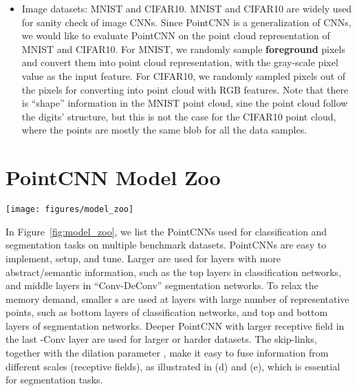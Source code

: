 \documentclass{article}
\begin{document}
\begin{itemize}[leftmargin=*]
	\item Image datasets: MNIST and CIFAR10. MNIST and CIFAR10 are widely used for sanity check of image CNNs. Since PointCNN is a generalization of CNNs, we would like to evaluate PointCNN on the point cloud representation of MNIST and CIFAR10. For MNIST, we randomly sample  \textbf{foreground} pixels and convert them into point cloud representation, with the gray-scale pixel value as the input feature. For CIFAR10, we randomly sampled  pixels out of the  pixels for converting into point cloud with RGB features. Note that there is ``shape'' information in the MNIST point cloud, sine the point cloud follow the digits' structure, but this is not the case for the CIFAR10 point cloud, where the points are mostly the same blob for all the data samples.
\end{itemize}

\section{PointCNN Model Zoo}
\label{sec:model_zoo}

\begin{figure*}[t!]
	\begin{center}
\texttt{[image: figures/model\_zoo]}
	\end{center}
	\caption{PointCNN model zoo, where (a) is used for ModelNet40 (channel number in bold) and ScanNet classification, (b) is used for TU-Berlin sketch classification, (c) is used for Quick Draw sketch classification, (d) is used for ScanNet and S3DIS segmentation, and (e) is used for ShapeNet Parts segmentation.}
	\label{fig:model_zoo}
\end{figure*}

In Figure~\ref{fig:model_zoo}, we list the PointCNNs used for classification and segmentation tasks on multiple benchmark datasets. PointCNNs are easy to implement, setup, and tune. Larger  are used for layers with more abstract/semantic information, such as the top layers in classification networks, and middle layers in ``Conv-DeConv'' segmentation networks. To relax the memory demand, smaller s are used at layers with large number of representative points, such as bottom layers of classification networks, and top and bottom layers of segmentation networks. Deeper PointCNN with larger receptive field in the last -Conv layer are used for larger or harder datasets. The skip-links, together with the dilation parameter , make it easy to fuse information from different scales (receptive fields), as illustrated in (d) and (e), which is essential for segmentation tasks.
\end{document}
